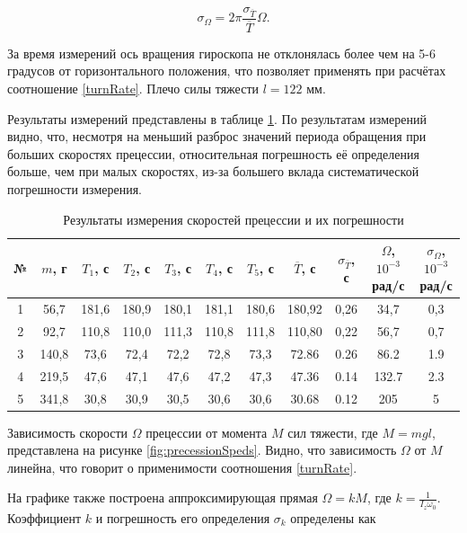 \documentclass[a4paper,12pt]{article} %
\begin{document}
\begin{equation}
    \sigma_\Omega = 2\pi\frac{\sigma_{\overline{T}}}{\overline{T}}\Omega.
\end{equation}

За время измерений ось вращения гироскопа не отклонялась более чем на 5-6 градусов от горизонтального положения, что позволяет применять при расчётах соотношение \eqref{turnRate}. Плечо силы тяжести $ l = 122 $ мм.

Результаты измерений представлены в таблице \ref{tab:precessionData}. По результатам измерений видно, что, несмотря на меньший разброс значений периода обращения при больших скоростях прецессии, относительная погрешность её определения больше, чем при малых скоростях, из-за большего вклада систематической погрешности измерения.

\begin{table}[h]
    \centering
    \begin{tabular}{|c|c|c|c|c|c|c|c|c|c|c|} \hline
        № & $ m $, г & $ T_1 $, с & $ T_2 $, с & $ T_3 $, с & $ T_4 $, с & $ T_5 $, с & $ \overline{T} $, с & $ \sigma_{\overline{T}} $, с & $ \Omega $, $ 10^{-3} $ рад/с & $ \sigma_\Omega $, $ 10^{-3} $ рад/с \\ \hline
        1 & 56,7 & 181,6 & 180,9 & 180,1 & 181,1 & 180,6 & 180,92 & 0,26 & 34,7 & 0,3 \\ \hline
        2 & 92,7 & 110,8 & 110,0 & 111,3 & 110,8 & 111,8 & 110,80 & 0,22 & 56,7 & 0,7 \\ \hline
        3 & 140,8 & 73,6 & 72,4 & 72,2 & 72,8 & 73,3 & 72.86 & 0.26 & 86.2 & 1.9 \\ \hline
        4 & 219,5 & 47,6 & 47,1 & 47,6 & 47,2 & 47,3 & 47.36 & 0.14 & 132.7 & 2.3 \\ \hline
        5 & 341,8 & 30,8 & 30,9 & 30,5 & 30,6 & 30,6 & 30.68 & 0.12 & 205 & 5 \\ \hline
    \end{tabular}
    \caption{Результаты измерения скоростей прецессии и их погрешности}
    \label{tab:precessionData}
\end{table}

Зависимость скорости $ \Omega $ прецессии от момента $ M $ сил тяжести, где $ M = mgl $, представлена на рисунке \ref{fig:precessionSpeds}. Видно, что зависимость $ \Omega $ от $ M $ линейна, что говорит о применимости соотношения \eqref{turnRate}.

На графике также построена аппроксимирующая прямая $ \Omega = kM $, где $ k = \frac{1}{I_z \omega_0} $. Коэффициент $ k $ и погрешность его определения $ \sigma_k $ определены как
\end{document}
